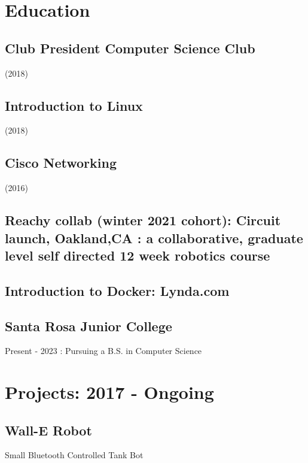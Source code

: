 \documentclass{article}
\begin{document}
    		    		
	\section{Education}
        \subsection{Club President  Computer Science Club}  (2018)
        \vspace{-2mm}   
		 
		\subsection{Introduction to Linux}  (2018)
        \vspace{-2mm}   

		\subsection{Cisco Networking}  (2016)
        \vspace{-2mm}   

        \subsection{Reachy collab (winter 2021 cohort): Circuit launch, Oakland,CA : a collaborative, graduate level self directed 12 week robotics course}
        \vspace{-2mm}   

        \subsection{Introduction to Docker: Lynda.com} 

        \subsection{Santa Rosa Junior College} Present - 2023 : Pursuing a B.S. in Computer Science
\section{Projects: 2017 - Ongoing}

	\subsection{Wall-E Robot}Small Bluetooth Controlled Tank Bot
    	\vspace{-3mm}
\end{document}
